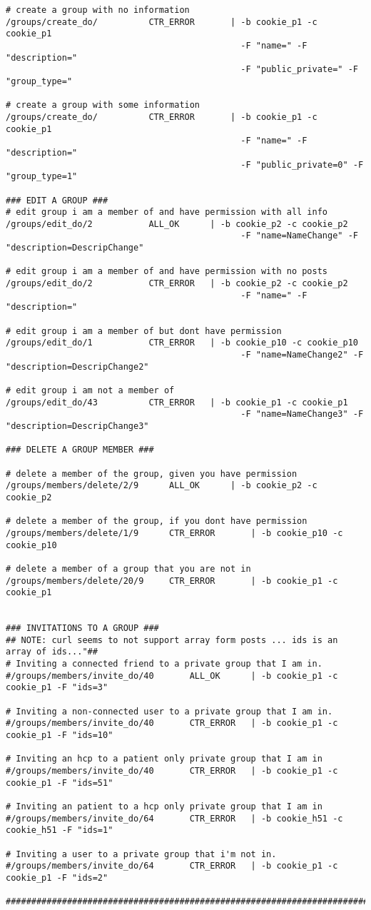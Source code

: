 \begin{verbatim}
# create a group with no information
/groups/create_do/ 			CTR_ERROR		| -b cookie_p1 -c cookie_p1 
                                              -F "name=" -F "description=" 
                                              -F "public_private=" -F "group_type="

# create a group with some information
/groups/create_do/ 			CTR_ERROR		| -b cookie_p1 -c cookie_p1 
                                              -F "name=" -F "description=" 
                                              -F "public_private=0" -F "group_type=1"

### EDIT A GROUP ###
# edit group i am a member of and have permission with all info
/groups/edit_do/2			ALL_OK		| -b cookie_p2 -c cookie_p2 
                                              -F "name=NameChange" -F "description=DescripChange"

# edit group i am a member of and have permission with no posts
/groups/edit_do/2			CTR_ERROR	| -b cookie_p2 -c cookie_p2 
                                              -F "name=" -F "description="

# edit group i am a member of but dont have permission
/groups/edit_do/1			CTR_ERROR	| -b cookie_p10 -c cookie_p10 
                                              -F "name=NameChange2" -F "description=DescripChange2"

# edit group i am not a member of
/groups/edit_do/43			CTR_ERROR	| -b cookie_p1 -c cookie_p1 
                                              -F "name=NameChange3" -F "description=DescripChange3"

### DELETE A GROUP MEMBER ###

# delete a member of the group, given you have permission
/groups/members/delete/2/9		ALL_OK		| -b cookie_p2 -c cookie_p2

# delete a member of the group, if you dont have permission
/groups/members/delete/1/9		CTR_ERROR		| -b cookie_p10 -c cookie_p10

# delete a member of a group that you are not in
/groups/members/delete/20/9		CTR_ERROR		| -b cookie_p1 -c cookie_p1


### INVITATIONS TO A GROUP ###
## NOTE: curl seems to not support array form posts ... ids is an array of ids..."##
# Inviting a connected friend to a private group that I am in. 
#/groups/members/invite_do/40		ALL_OK		| -b cookie_p1 -c cookie_p1 -F "ids=3"

# Inviting a non-connected user to a private group that I am in. 
#/groups/members/invite_do/40		CTR_ERROR	| -b cookie_p1 -c cookie_p1 -F "ids=10"

# Inviting an hcp to a patient only private group that I am in
#/groups/members/invite_do/40		CTR_ERROR	| -b cookie_p1 -c cookie_p1 -F "ids=51"

# Inviting an patient to a hcp only private group that I am in
#/groups/members/invite_do/64		CTR_ERROR	| -b cookie_h51 -c cookie_h51 -F "ids=1"

# Inviting a user to a private group that i'm not in.
#/groups/members/invite_do/64		CTR_ERROR	| -b cookie_p1 -c cookie_p1 -F "ids=2"

########################################################################
\end{verbatim}

